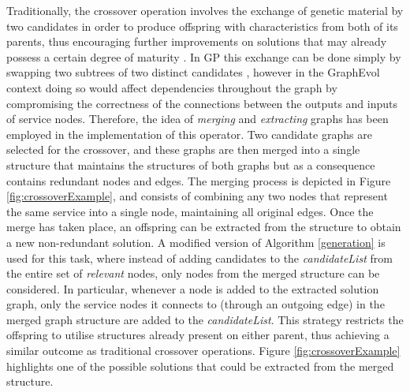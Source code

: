 \documentclass{article}
\begin{document}
Traditionally, the crossover operation involves the exchange of genetic material by two candidates in order to produce
offspring with characteristics from both of its parents, thus encouraging further improvements on solutions that may already
possess a certain degree of maturity \cite{qi1994theoretical}. In GP this exchange can be done simply by swapping two subtrees
of two distinct candidates \cite{aversano2006genetic}, however in the GraphEvol context doing so would affect dependencies
throughout the graph by compromising the correctness of the connections between the outputs and inputs of service nodes. Therefore,
the idea of \textit{merging} and \textit{extracting} graphs has been employed in the implementation of this operator. Two candidate
graphs are selected for the crossover, and these graphs are then merged into a single structure that maintains the structures of
both graphs but as a consequence contains redundant nodes and edges. The merging process is depicted in Figure \ref{fig:crossoverExample},
and consists of combining any two nodes that represent the same service into a single node, maintaining all original edges. Once the merge has
taken place, an offspring can be extracted from the structure to obtain a new non-redundant solution. A modified version of Algorithm
\ref{generation} is used for this task, where instead of adding candidates to the \textit{candidateList} from the entire set of
\textit{relevant} nodes, only nodes from the merged structure can be considered. In particular, whenever a node is added to the extracted
solution graph, only the service nodes it connects to (through an outgoing edge) in the merged graph structure are added to the
\textit{candidateList}. This strategy restricts the offspring to utilise structures already present on either parent, thus achieving
a similar outcome as traditional crossover operations. Figure \ref{fig:crossoverExample} highlights one of the possible solutions that
could be extracted from the merged structure.
\end{document}
